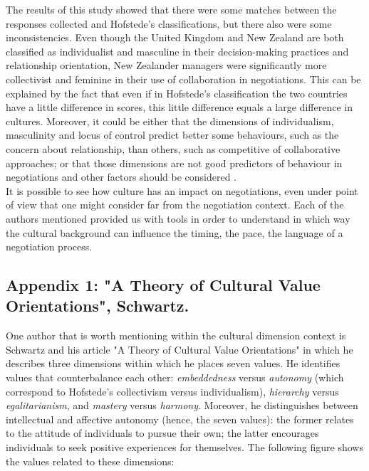 \documentclass[../main.tex]{subfiles}
\begin{document}
The results of this study showed that there were some matches between the responses collected and Hofstede's classifications, but there also were some inconsistencies. Even though the United Kingdom and New Zealand are both classified as individualist and masculine in their decision-making practices and relationship orientation, New Zealander managers were significantly more collectivist and feminine in their use of collaboration in negotiations. This can be explained by the fact that even if in Hofstede's classification the two countries have a little difference in scores, this little difference equals a large difference in cultures. Moreover, it could be either that the dimensions of individualism, masculinity and locus of control predict better some behaviours, such as the concern about relationship, than others, such as competitive of collaborative approaches; or that those dimensions are not good predictors of behaviour in negotiations and other factors should be considered \mancite\autocite[19]{tang}.\\

It is possible to see how culture has an impact on negotiations, even under point of view that one might consider far from the negotiation context. Each of the authors mentioned provided us with tools in order to understand in which way the cultural background can influence the timing, the pace, the language of a negotiation process.
\pagebreak

\subsection*{Appendix 1: "A Theory of Cultural Value Orientations", Schwartz.}

One author that is worth mentioning within the cultural dimension context is Schwartz and his article "A Theory of Cultural Value Orientations" in which he describes three dimensions within which he places seven values. He identifies values that counterbalance each other: \textit{embeddedness} versus \textit{autonomy} (which correspond to Hofstede's collectivism versus individualism), \textit{hierarchy} versus \textit{egalitarianism}, and \textit{mastery} versus \textit{harmony}. Moreover, he distinguishes between intellectual and affective autonomy (hence, the seven values): the former relates to the attitude of individuals to pursue their own; the latter encourages individuals to seek positive experiences for themselves. The following figure shows the values related to these dimensions:
\end{document}

